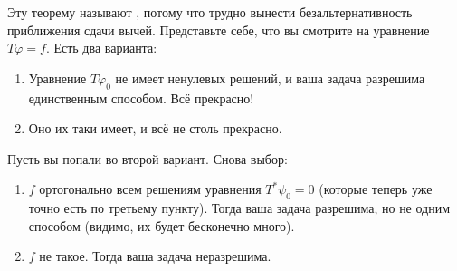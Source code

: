\documentclass{trlnotes}
\begin{document}
    \begin{rem}
        Эту теорему называют , потому что трудно вынести безальтернативность приближения сдачи вычей. Представьте себе, что вы смотрите на уравнение $T\varphi = f$. Есть два варианта:
        \begin{enumerate}
            \item Уравнение $T \varphi_0$ не имеет ненулевых решений, и ваша задача разрешима единственным способом. Всё прекрасно!
            \item Оно их таки имеет, и всё не столь прекрасно.
        \end{enumerate}
        Пусть вы попали во второй вариант. Снова выбор:
        \begin{enumerate}
            \item $f$ ортогонально всем решениям уравнения $T^{*} \psi_0 = 0$ (которые теперь уже точно есть по третьему пункту). Тогда ваша задача разрешима, но не одним способом (видимо, их будет бесконечно много).
            \item $f$ не такое. Тогда ваша задача неразрешима.
        \end{enumerate}
    \end{rem}
\end{document}
